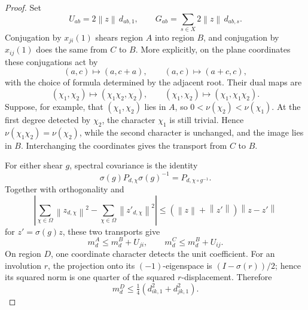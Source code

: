 \documentclass[11pt]{amsart}
\theoremstyle{definition}
\theoremstyle{plain}
\newcommand{\norm}[1]{\left\lVert#1\right\rVert}
\begin{document}
\begin{proof}
Set
\[
 U_{ab}=2\norm z\,d_{ab,1},\qquad
 G_{ab}=\sum_{s\in X}2\norm z\,d_{ab,s}.
\]
Conjugation by \(x_{ji}(1)\) shears region \(A\) into region \(B\),
and conjugation by \(x_{ij}(1)\) does the same from \(C\) to
\(B\).  More explicitly, on the plane coordinates these conjugations
act by
\[
 (a,c)\longmapsto(a,c+a),
 \qquad (a,c)\longmapsto(a+c,c),
\]
with the choice of formula determined by the adjacent root.  Their
dual maps are
\[
 (\chi_1,\chi_2)\longmapsto(\chi_1\chi_2,\chi_2),
 \qquad
 (\chi_1,\chi_2)\longmapsto(\chi_1,\chi_1\chi_2).
\]
Suppose, for example, that \((\chi_1,\chi_2)\) lies in \(A\), so
\(0<\nu(\chi_2)<\nu(\chi_1)\).  At the first degree detected by
\(\chi_2\), the character \(\chi_1\) is still trivial.  Hence
\(\nu(\chi_1\chi_2)=\nu(\chi_2)\), while the second character is
unchanged, and the image lies in \(B\).  Interchanging the
coordinates gives the transport from \(C\) to \(B\).

For either shear \(g\), spectral covariance is the identity
\[
 \sigma(g)P_{d,\chi}\sigma(g)^{-1}=P_{d,\chi\circ g^{-1}}.
\]
Together with orthogonality and
\[
 \left|\sum_{\chi\in\Omega}\norm{z_{d,\chi}}^2-
 \sum_{\chi\in\Omega}\norm{z'_{d,\chi}}^2\right|
 \le(\norm z+\norm{z'})\norm{z-z'}
\]
for \(z'=\sigma(g)z\), these two transports give
\begin{equation}\label{eq:ABCB}
 m_d^A\le m_d^B+U_{ji},\qquad
 m_d^C\le m_d^B+U_{ij}.
\end{equation}
On region \(D\), one coordinate character detects the unit
coefficient.  For an involution \(r\), the projection onto its
\((-1)\)-eigenspace is \((I-\sigma(r))/2\); hence its squared norm is
one quarter of the squared \(r\)-displacement.  Therefore
\begin{equation}\label{eq:Dmass}
 m_d^D\le\tfrac14(d_{ik,1}^2+d_{jk,1}^2).
\end{equation}


\end{proof}
\end{document}
